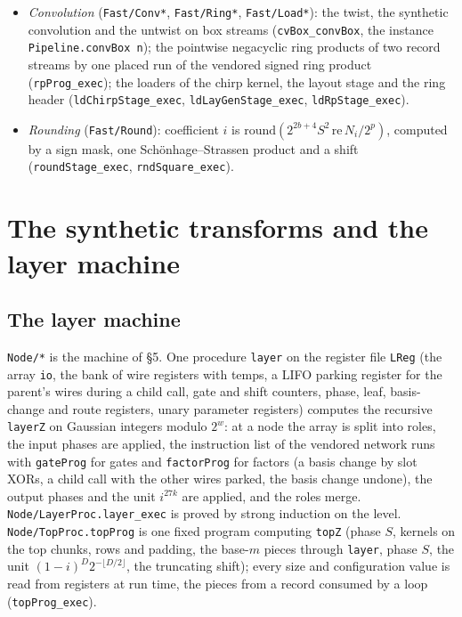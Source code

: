 \documentclass[11pt]{amsart}
\theoremstyle{remark}
\begin{document}
\begin{itemize}
\texttt{Fast/CMul*}): the chirp kernel box from the axis tables by repetition passes and table
products (\texttt{cst\_chirpBox\_kernel}); entrywise chirp products, conjugation, the exact
scale by $2^\gamma$ and the pointwise product (\texttt{cst\_point\_runs}), each through the
complex multiplier \texttt{cmulStream} over Schönhage--Strassen.
\item \emph{Convolution} (\texttt{Fast/Conv*}, \texttt{Fast/Ring*}, \texttt{Fast/Load*}): the
twist, the synthetic convolution and the untwist on box streams
(\texttt{cvBox\_convBox}, the instance \texttt{Pipeline.convBox n}); the pointwise negacyclic
ring products of two record streams by one placed run of the vendored signed ring product
(\texttt{rpProg\_exec}); the loaders of the chirp kernel, the layout stage and the ring header
(\texttt{ldChirpStage\_exec}, \texttt{ldLayGenStage\_exec}, \texttt{ldRpStage\_exec}).
\item \emph{Rounding} (\texttt{Fast/Round}): coefficient $i$ is
$\mathrm{round}(2^{2b+4}S^2\,\mathrm{re}\,N_i/2^p)$, computed by a sign mask, one
Schönhage--Strassen product and a shift (\texttt{roundStage\_exec}, \texttt{rndSquare\_exec}).
\end{itemize}

\section{The synthetic transforms and the layer machine}

\subsection*{The layer machine}
\texttt{Node/*} is the machine of \S5. One procedure \texttt{layer} on the register file
\texttt{LReg} (the array \texttt{io}, the bank of wire registers with temps, a LIFO parking
register for the parent's wires during a child call, gate and shift counters, phase, leaf,
basis-change and route registers, unary parameter registers) computes the recursive
\texttt{layerZ} on Gaussian integers modulo $2^w$: at a node the array is split into roles,
the input phases are applied, the instruction list of the vendored network runs with
\texttt{gateProg} for gates and \texttt{factorProg} for factors (a basis change by slot XORs,
a child call with the other wires parked, the basis change undone), the output phases and the
unit $i^{27k}$ are applied, and the roles merge. \texttt{Node/LayerProc.layer\_exec} is proved
by strong induction on the level. \texttt{Node/TopProc.topProg} is one fixed program computing
\texttt{topZ} (phase $S$, kernels on the top chunks, rows and padding, the base-$m$ pieces
through \texttt{layer}, phase $S$, the unit $(1-i)^D2^{-\lfloor D/2\rfloor}$, the truncating
shift); every size and configuration value is read from registers at run time, the pieces from
a record consumed by a loop (\texttt{topProg\_exec}).
\end{document}
